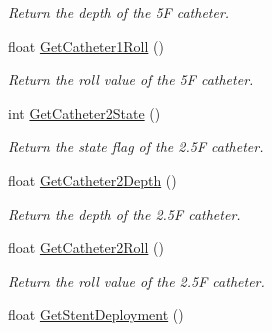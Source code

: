 \begin{DoxyCompactItemize}
\begin{DoxyCompactList}\small\item\em Return the depth of the 5F catheter. \item\end{DoxyCompactList}\item 
\hypertarget{classvtkVSP_a2bd0656b6943f372082c6a60abd1ea8f}{
float \hyperlink{classvtkVSP_a2bd0656b6943f372082c6a60abd1ea8f}{GetCatheter1Roll} ()}
\label{classvtkVSP_a2bd0656b6943f372082c6a60abd1ea8f}

\begin{DoxyCompactList}\small\item\em Return the roll value of the 5F catheter. \item\end{DoxyCompactList}\item 
\hypertarget{classvtkVSP_a9ffc93c092f6c0dd4a217f221eaa2056}{
int \hyperlink{classvtkVSP_a9ffc93c092f6c0dd4a217f221eaa2056}{GetCatheter2State} ()}
\label{classvtkVSP_a9ffc93c092f6c0dd4a217f221eaa2056}

\begin{DoxyCompactList}\small\item\em Return the state flag of the 2.5F catheter. \item\end{DoxyCompactList}\item 
\hypertarget{classvtkVSP_a562a02d929ce09aa856167257bcd0381}{
float \hyperlink{classvtkVSP_a562a02d929ce09aa856167257bcd0381}{GetCatheter2Depth} ()}
\label{classvtkVSP_a562a02d929ce09aa856167257bcd0381}

\begin{DoxyCompactList}\small\item\em Return the depth of the 2.5F catheter. \item\end{DoxyCompactList}\item 
\hypertarget{classvtkVSP_afc01854a1a1f7dffaf0e6563eda84119}{
float \hyperlink{classvtkVSP_afc01854a1a1f7dffaf0e6563eda84119}{GetCatheter2Roll} ()}
\label{classvtkVSP_afc01854a1a1f7dffaf0e6563eda84119}

\begin{DoxyCompactList}\small\item\em Return the roll value of the 2.5F catheter. \item\end{DoxyCompactList}\item 
\hypertarget{classvtkVSP_a47ca891db4ba2d8b6f06cbfafcb07152}{
float \hyperlink{classvtkVSP_a47ca891db4ba2d8b6f06cbfafcb07152}{GetStentDeployment} ()}
\label{classvtkVSP_a47ca891db4ba2d8b6f06cbfafcb07152}


\end{DoxyCompactItemize}
